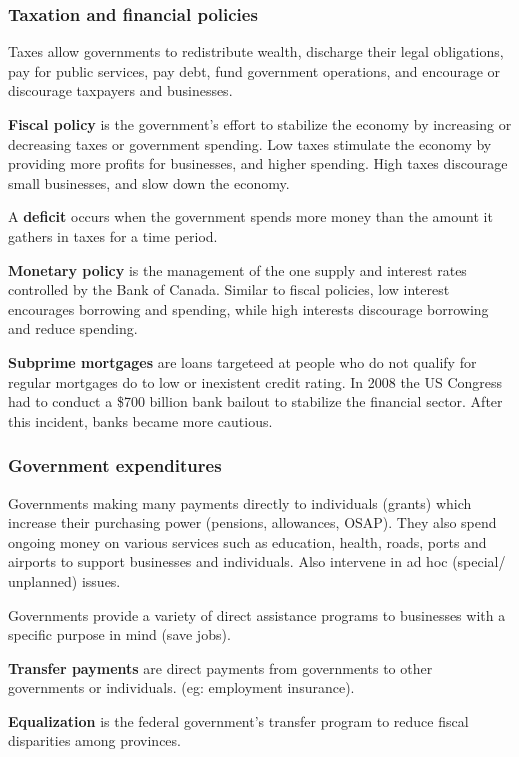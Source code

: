 \documentclass[english, 12pt]{article}
\begin{document}
\subsubsection{Taxation and financial policies}
Taxes allow governments to redistribute wealth, discharge their legal obligations, pay for public services, pay debt, fund government operations, and encourage or discourage taxpayers and businesses.
\begin{defn}
\textbf{Fiscal policy} is the government's effort to stabilize the economy by increasing or decreasing taxes or government spending. Low taxes stimulate the economy by providing more profits for businesses, and higher spending. High taxes discourage small businesses, and slow down the economy.
\end{defn}
\begin{defn}
A \textbf{deficit} occurs when the government spends more money than the amount it gathers in taxes for a time period.
\end{defn}
\begin{defn}
\textbf{Monetary policy} is the management of the one supply and interest rates controlled by the Bank of Canada. Similar to fiscal policies, low interest encourages borrowing and spending, while high interests discourage borrowing and reduce spending.
\end{defn}
\begin{defn}
\textbf{Subprime mortgages} are loans targeteed at people who do not qualify for regular mortgages do to low or inexistent credit rating. In 2008 the US Congress had to conduct a \$700 billion bank bailout to stabilize the financial sector. After this incident, banks became more cautious.
\end{defn}
\subsubsection{Government expenditures}
Governments making many payments directly to individuals (grants) which increase their purchasing power (pensions, allowances, OSAP). They also spend ongoing money on various services such as education, health, roads, ports and airports to support businesses and individuals. Also intervene in ad hoc (special/ unplanned) issues.

\begin{exmp}
Governments provide a variety of direct assistance programs to businesses with a specific purpose in mind (save jobs). 
\end{exmp}
\begin{defn}
\textbf{Transfer payments} are direct payments from governments to other governments or individuals. (eg: employment insurance).
\end{defn}
\begin{defn}
\textbf{Equalization} is the federal government's transfer program to reduce fiscal disparities among provinces.
\end{defn}
\end{document}
